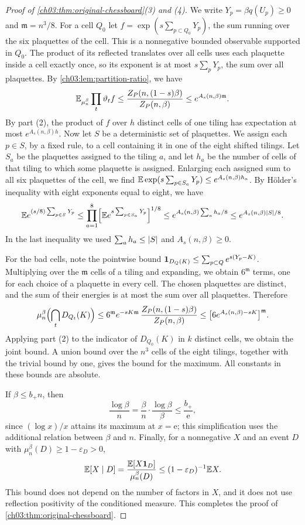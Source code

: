 \begin{proof}[Proof of \cref{ch03:thm:original-chessboard}(3) and (4)]
We write $Y_p=\beta q(U_p)\ge0$ and $\mathfrak m=n^3/8$. For a cell $Q_0$ let $f=\exp(s\sum_{p\subset Q_0}Y_p)$, the sum running over the six plaquettes of the cell. This is a nonnegative bounded observable supported in $Q_0$. The product of its reflected translates over all cells uses each plaquette inside a cell exactly once, so its exponent is at most $s\sum_pY_p$, the sum over all plaquettes. By \cref{ch03:lem:partition-ratio}, we have
\[
 \mathbb E_{\mu_n^\beta}\prod_t\vartheta_tf\le\frac{Z_P(n,(1-s)\beta)}{Z_P(n,\beta)}\le e^{A_s(n,\beta)\mathfrak m}.
\]
By part (2), the product of $f$ over $h$ distinct cells of one tiling has expectation at most $e^{A_s(n,\beta)h}$. Now let $S$ be a deterministic set of plaquettes. We assign each $p\in S$, by a fixed rule, to a cell containing it in one of the eight shifted tilings. Let $S_a$ be the plaquettes assigned to the tiling $a$, and let $h_a$ be the number of cells of that tiling to which some plaquette is assigned. Enlarging each assigned sum to all six plaquettes of the cell, we find $\mathbb E\exp(s\sum_{p\in S_a}Y_p)\le e^{A_s(n,\beta)h_a}$. By H\"older's inequality with eight exponents equal to eight, we have
\[
 \mathbb E e^{(s/8)\sum_{p\in S}Y_p}\le\prod_{a=1}^8\Bigl[\mathbb E e^{s\sum_{p\in S_a}Y_p}\Bigr]^{1/8}\le e^{A_s(n,\beta)\sum_ah_a/8}\le e^{A_s(n,\beta)\lvert S\rvert/8}.
\]
In the last inequality we used $\sum_ah_a\le\lvert S\rvert$ and $A_s(n,\beta)\ge0$.

For the bad cells, note the pointwise bound $\mathbf 1_{D_Q(K)}\le\sum_{p\subset Q}e^{s(Y_p-K)}$. Multiplying over the $\mathfrak m$ cells of a tiling and expanding, we obtain $6^{\mathfrak m}$ terms, one for each choice of a plaquette in every cell. The chosen plaquettes are distinct, and the sum of their energies is at most the sum over all plaquettes. Therefore
\[
 \mu_n^\beta\Bigl(\bigcap_tD_{Q_t}(K)\Bigr)\le6^{\mathfrak m}e^{-sK\mathfrak m}\,\frac{Z_P(n,(1-s)\beta)}{Z_P(n,\beta)}\le\bigl[6e^{A_s(n,\beta)-sK}\bigr]^{\mathfrak m}.
\]
Applying part (2) to the indicator of $D_{Q_0}(K)$ in $k$ distinct cells, we obtain the joint bound. A union bound over the $n^3$ cells of the eight tilings, together with the trivial bound by one, gives the bound for the maximum. All constants in these bounds are absolute.

If $\beta\le b_+n$, then
\[
 \frac{\log\beta}n=\frac\beta n\cdot\frac{\log\beta}\beta\le\frac{b_+}{\mathrm e},
\]
since $(\log x)/x$ attains its maximum at $x=\mathrm e$; this simplification uses the additional relation between $\beta$ and $n$. Finally, for a nonnegative $X$ and an event $D$ with $\mu_n^\beta(D)\ge1-\varepsilon_D>0$,
\[
 \mathbb E[X\mid D]=\frac{\mathbb E[X\mathbf 1_D]}{\mu_n^\beta(D)}\le(1-\varepsilon_D)^{-1}\mathbb E X.
\]
This bound does not depend on the number of factors in $X$, and it does not use reflection positivity of the conditioned measure. This completes the proof of \cref{ch03:thm:original-chessboard}.
\end{proof}
